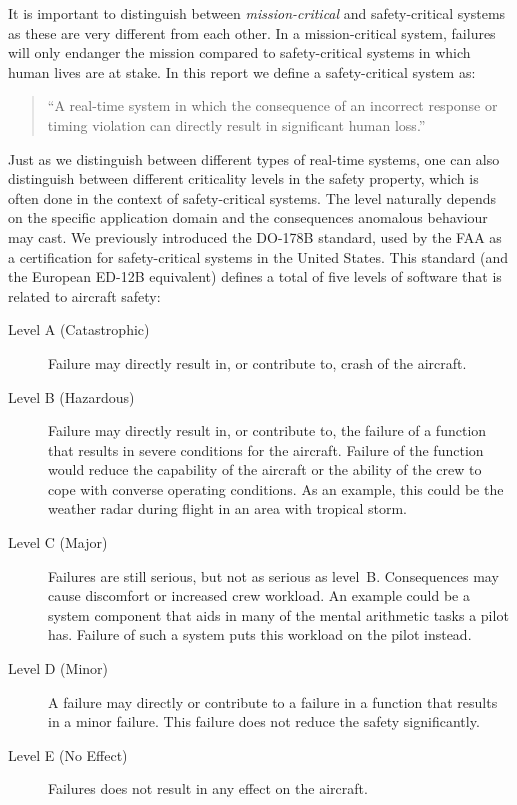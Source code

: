 It is important to distinguish between \textit{mission-critical} and safety-critical systems as these are very different from each other. In a mission-critical system, failures will only endanger the mission compared to safety-critical systems in which human lives are at stake. In this report we define a safety-critical system as:

\begin{quotation}
``A real-time system in which the consequence of an incorrect response or timing violation can directly result in significant human loss.''~\cite{alan2001real}
\end{quotation}

Just as we distinguish between different types of real-time systems, one can also distinguish between different criticality levels in the safety property, which is often done in the context of safety-critical systems. The level naturally depends on the specific application domain and the consequences anomalous behaviour may cast. We previously introduced the DO-178B standard, used by the FAA as a certification for safety-critical systems in the United States. This standard (and the European ED-12B equivalent) defines a total of five levels of software that is related to aircraft safety:
\begin{description}
	\item[Level A (Catastrophic)] Failure may directly result in, or contribute to, crash of the aircraft.  
	\item[Level B (Hazardous)] Failure may directly result in, or contribute to, the failure of a function that results in severe conditions for the aircraft. Failure of the function would reduce the capability of the aircraft or the ability of the crew to cope with converse operating conditions. As an example, this could be the weather radar during flight in an area with tropical storm.
	\item[Level C (Major)] Failures are still serious, but not as serious as level~B. Consequences may cause discomfort or increased crew workload. An example could be a system component that aids in many of the mental arithmetic tasks a pilot has. Failure of such a system puts this workload on the pilot instead.
	\item[Level D (Minor)] A failure may directly or contribute to a failure in a function that results in a minor failure. This failure does not reduce the safety significantly.
	\item[Level E (No Effect)] Failures does not result in any effect on the aircraft.
\end{description}

